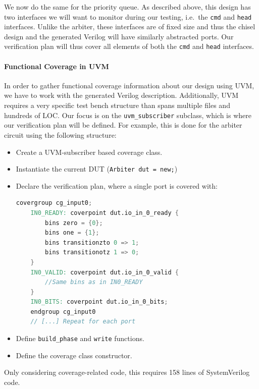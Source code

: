 \documentclass[conference]{IEEEtran}
\begin{document}
We now do the same for the priority queue. 
As described above, this design has two interfaces we will want to monitor during our testing, i.e.\ the \texttt{cmd} and \texttt{head} interfaces.
Unlike the arbiter, these interfaces are of fixed size and thus the chisel design and the generated Verilog will have similarly abstracted ports.
Our verification plan will thus cover all elements of both the \texttt{cmd} and \texttt{head} interfaces.
 
\paragraph{Functional Coverage in UVM} In order to gather functional coverage information about our design using UVM, we have to work with the generated Verilog description.
Additionally, UVM requires a very specific test bench structure than spans multiple files and hundreds of LOC.
Our focus is on the \texttt{uvm\_subscriber} subclass, which is where our verification plan will be defined.
For example, this is done for the arbiter circuit using the following structure:
\begin{itemize}
    \item Create a UVM-subscriber based coverage class.
    \item Instantiate the current DUT (\texttt{Arbiter dut = new;})
    \item Declare the verification plan, where a single port is covered with: 
    \begin{lstlisting}[language=verilog]
	covergroup cg_input0;
	IN0_READY: coverpoint dut.io_in_0_ready {
		bins zero = {0};
		bins one = {1};
		bins transitionzto 0 => 1;
		bins transitionotz 1 => 0;
	}
	IN0_VALID: coverpoint dut.io_in_0_valid {
		//Same bins as in IN0_READY
	}
	IN0_BITS: coverpoint dut.io_in_0_bits;
	endgroup cg_input0
	// [...] Repeat for each port
    \end{lstlisting}
    \item Define \texttt{build\_phase} and \texttt{write} functions.
    \item Define the coverage class constructor.
\end{itemize}  
Only considering coverage-related code, this requires 158 lines of SystemVerilog code. 
\end{document}
